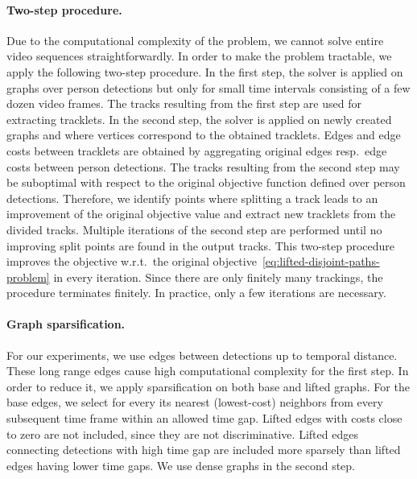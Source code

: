 \documentclass{article}
\begin{document}
\paragraph{Two-step procedure.}
Due to the computational complexity of the problem, we cannot solve entire video sequences straightforwardly. 
In order to make the problem tractable, we apply the following two-step procedure.
In the first step, the solver is applied on graphs over person detections but only for small time intervals consisting of a few dozen video frames.  
The tracks resulting from the first step are used for extracting tracklets. 
In the second step, the solver is applied on newly created graphs  and  where vertices correspond to the obtained tracklets.
Edges and edge costs between tracklets are obtained by aggregating original edges resp.\ edge costs between person detections.
The tracks resulting from the second step may be suboptimal with respect to the original objective function defined over person detections.
Therefore, we identify points where splitting a track leads to an improvement of the original objective value and extract new tracklets from the divided tracks. 
Multiple iterations of the second step are performed until no improving split points are found in the output tracks.
This two-step procedure improves the objective w.r.t.\ the original objective~\eqref{eq:lifted-disjoint-paths-problem} in every iteration.
Since there are only finitely many trackings, the procedure terminates finitely.
In practice, only a few iterations are necessary.



\paragraph{Graph sparsification. }For our experiments, we use edges between detections up to  temporal distance. These long range edges cause high computational complexity for the first step. In order to reduce it, we apply sparsification on both base and lifted graphs. For the base edges, we select for every  its  nearest (lowest-cost) neighbors from every subsequent time frame within an allowed time gap. Lifted edges with costs close to zero are not included, since they are not discriminative. Lifted edges connecting detections with high time gap are included more sparsely than lifted edges having lower time gaps. We use dense graphs in the second step. 
\end{document}

